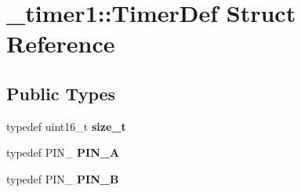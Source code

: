 \hypertarget{struct__timer1_1_1TimerDef}{}\section{\+\_\+timer1\+:\+:Timer\+Def Struct Reference}
\label{struct__timer1_1_1TimerDef}
\subsection*{Public Types}
\begin{DoxyCompactItemize}
\item 
typedef uint16\+\_\+t {\bfseries size\+\_\+t}\hypertarget{struct__timer1_1_1TimerDef_ab1eff69c17b23ae20403b94c8a286e27}{}\label{struct__timer1_1_1TimerDef_ab1eff69c17b23ae20403b94c8a286e27}

\item 
typedef P\+I\+N\+\_ {\bfseries P\+I\+N\+\_\+A}\hypertarget{struct__timer1_1_1TimerDef_a6b8de889a9e10b6889f751db480fb92e}{}\label{struct__timer1_1_1TimerDef_a6b8de889a9e10b6889f751db480fb92e}

\item 
typedef P\+I\+N\+\_ {\bfseries P\+I\+N\+\_\+B}\hypertarget{struct__timer1_1_1TimerDef_adb1333d11a42c46fe8aeb8e9a85dad7f}{}\label{struct__timer1_1_1TimerDef_adb1333d11a42c46fe8aeb8e9a85dad7f}

\end{DoxyCompactItemize}
